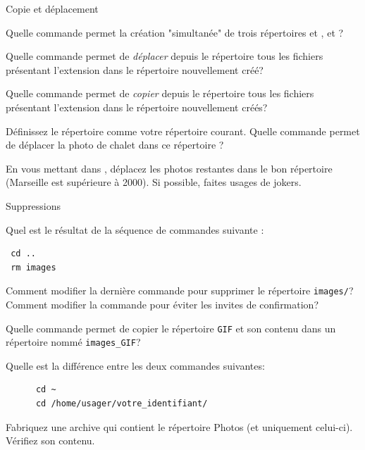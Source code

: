 \begin{exercice}
  \begin{exercicelet}{Copie et déplacement}
    \begin{questions}
    \item Quelle commande permet la création "simultanée" de trois
      répertoires  et ,
       et  ?
    \item Quelle commande permet de \emph{déplacer} depuis le répertoire
       tous les fichiers présentant l'extension
       dans le répertoire  nouvellement créé?
    \item Quelle commande permet de \emph{copier} depuis le répertoire
       tous les fichiers présentant l'extension
       dans le répertoire  nouvellement créés?
    \item Définissez le répertoire  comme votre répertoire
      courant. Quelle commande permet de déplacer la photo de chalet dans ce répertoire ?
    \item En vous mettant dans , déplacez les photos
      restantes dans le bon répertoire (Marseille est supérieure à
      2000). Si possible, faites usages de jokers.
    \end{questions}
  \end{exercicelet}
\end{exercice}
\begin{exercice}
  \begin{exercicelet}{Suppressions}
    \begin{questions}
    \item Quel est le résultat de la séquence de commandes suivante :
\begin{verbatim}
 cd ..
 rm images
\end{verbatim}
    \item Comment modifier la dernière commande pour supprimer le
      répertoire \texttt{images/}? Comment modifier la commande pour
      éviter les invites de confirmation?
    \item Quelle commande permet de copier le répertoire \texttt{GIF} et
      son contenu dans un répertoire nommé \verb|images_GIF|?
    \item Quelle est la différence entre les deux commandes suivantes:
\begin{verbatim}
      cd ~
      cd /home/usager/votre_identifiant/
\end{verbatim}
    \item Fabriquez une archive qui contient le répertoire Photos (et
      uniquement celui-ci). Vérifiez son contenu.
    \end{questions}
  \end{exercicelet}
\end{exercice}

